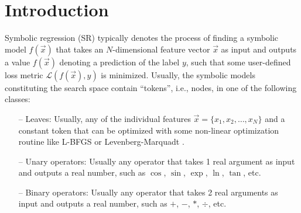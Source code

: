 \documentclass[runningheads]{llncs}
\begin{document}
\section{Introduction}
Symbolic regression (SR) typically denotes the process of finding a symbolic model $f\left(\vec{x}\right)$ that takes an $N$-dimensional feature vector $\vec{x}$ as input and outputs a value $f\left(\vec{x}\right)$ denoting a prediction of the label $y$, such that some user-defined loss metric $\mathcal{L}\left(f\left(\vec{x}\right),y\right)$ is minimized. Usually, the symbolic models constituting the search space contain ``tokens'', i.e., nodes, in one of the following classes:
\begin{itemize}
\item[--] Leaves: Usually, any of the individual features $\vec{x} = \{x_1, x_2, \ldots,x_{N}\}$ and a constant token that can be optimized with some non-linear optimization routine like L-BFGS \cite{doi:10.1137/0916069} or Levenberg-Marquadt \cite{83b09f23-b20e-3617-8f72-24765b713f7b} \cite{doi:10.1137/0111030}.
\item[--] Unary operators: Usually any operator that takes 1 real argument as input and outputs a real number, such as $\cos$, $\sin$, $\exp$, $\ln$, $\tan$, etc.
\item[--] Binary operators: Usually any operator that takes 2 real arguments as input and outputs a real number, such as $+$, $-$, $*$, $\div$, etc.
\end{itemize}
\end{document}
